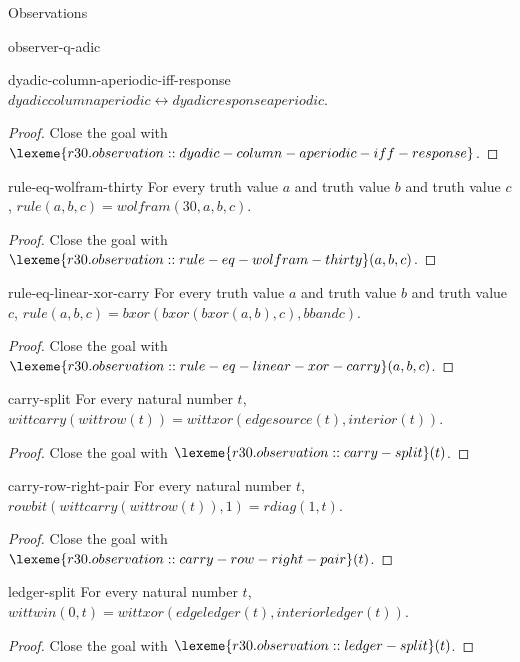 \begin{lexlean}{Observations}
\begin{section}{observer-q-adic}
\begin{theorem}{dyadic-column-aperiodic-iff-response}
\(dyadiccolumnaperiodic ↔ dyadicresponseaperiodic\).
\begin{proof}
Close the goal with \(\lexeme{r30.observation::dyadic-column-aperiodic-iff-response}\).
\end{proof}
\end{theorem}

\begin{theorem}{rule-eq-wolfram-thirty}
For every truth value \(a\) and truth value \(b\) and truth value \(c\), \(rule(a, b, c) = wolfram(30, a, b, c)\).
\begin{proof}
Close the goal with \(\lexeme{r30.observation::rule-eq-wolfram-thirty}(a, b, c)\).
\end{proof}
\end{theorem}

\begin{theorem}{rule-eq-linear-xor-carry}
For every truth value \(a\) and truth value \(b\) and truth value \(c\), \(rule(a, b, c) = bxor(bxor(bxor(a, b), c), b band c)\).
\begin{proof}
Close the goal with \(\lexeme{r30.observation::rule-eq-linear-xor-carry}(a, b, c)\).
\end{proof}
\end{theorem}

\begin{theorem}{carry-split}
For every natural number \(t\), \(wittcarry(wittrow(t)) = wittxor(edgesource(t), interior(t))\).
\begin{proof}
Close the goal with \(\lexeme{r30.observation::carry-split}(t)\).
\end{proof}
\end{theorem}

\begin{theorem}{carry-row-right-pair}
For every natural number \(t\), \(rowbit(wittcarry(wittrow(t)), 1) = rdiag(1, t)\).
\begin{proof}
Close the goal with \(\lexeme{r30.observation::carry-row-right-pair}(t)\).
\end{proof}
\end{theorem}

\begin{theorem}{ledger-split}
For every natural number \(t\), \(wittwin(0, t) = wittxor(edgeledger(t), interiorledger(t))\).
\begin{proof}
Close the goal with \(\lexeme{r30.observation::ledger-split}(t)\).
\end{proof}
\end{theorem}


\end{section}
\end{lexlean}
